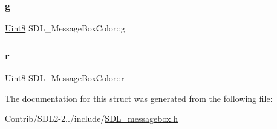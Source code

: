 \mbox{\label{struct_s_d_l___message_box_color_a5820adab0b32aa3eade101ea36ed6b4a}} 
\subsubsection{\texorpdfstring{g}{g}}
{\footnotesize\ttfamily \mbox{\hyperlink{_s_d_l__stdinc_8h_a2944638813a090aa23e62f4da842c3e2}{Uint8}} S\+D\+L\+\_\+\+Message\+Box\+Color\+::g}

\mbox{\label{struct_s_d_l___message_box_color_a43ab2172c10058380fcf67ecc3f53184}} 
\subsubsection{\texorpdfstring{r}{r}}
{\footnotesize\ttfamily \mbox{\hyperlink{_s_d_l__stdinc_8h_a2944638813a090aa23e62f4da842c3e2}{Uint8}} S\+D\+L\+\_\+\+Message\+Box\+Color\+::r}



The documentation for this struct was generated from the following file\+:\begin{DoxyCompactItemize}
\item 
Contrib/\+S\+D\+L2-\/2../include/\mbox{\hyperlink{_s_d_l__messagebox_8h}{S\+D\+L\+\_\+messagebox.\+h}}\end{DoxyCompactItemize}
